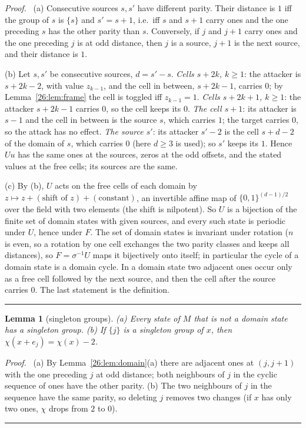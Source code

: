 \documentclass[10pt,a4paper]{article}
\newtheorem{lemma}[theorem]{Lemma}
\newcommand{\qedmark}{\rule{1.1ex}{1.1ex}}
\newenvironment{proof}[1][Proof]{\par\smallskip\noindent\textit{#1.}\ }{\hfill\qedmark\par\smallskip}
\begin{document}
\begin{proof}
(a) Consecutive sources $s,s'$ have different parity. Their distance is $1$ iff the group of $s$ is $\{s\}$ and
$s'=s+1$, i.e.\ iff $s$ and $s+1$ carry ones and the one preceding $s$ has the other parity than $s$. Conversely, if
$j$ and $j+1$ carry ones and the one preceding $j$ is at odd distance, then $j$ is a source, $j+1$ is the next source,
and their distance is $1$.

(b) Let $s,s'$ be consecutive sources, $d=s'-s$. \emph{Cells $s+2k$, $k\ge1$}: the attacker is $s+2k-2$, with value
$z_{k-1}$, and the cell in between, $s+2k-1$, carries $0$; by Lemma~\ref{26:lem:frame} the cell is toggled iff
$z_{k-1}=1$. \emph{Cells $s+2k+1$, $k\ge1$}: the attacker $s+2k-1$ carries $0$, so the cell keeps its $0$.
\emph{The cell $s+1$}: its attacker is $s-1$ and the cell in between is the source $s$, which carries $1$; the target
carries $0$, so the attack has no effect. \emph{The source $s'$}: its attacker $s'-2$ is the cell $s+d-2$ of the
domain of $s$, which carries $0$ (here $d\ge3$ is used); so $s'$ keeps its $1$. Hence $Uu$ has the same ones at the
sources, zeros at the odd offsets, and the stated values at the free cells; its sources are the same.

(c) By (b), $U$ acts on the free cells of each domain by $z\mapsto z+(\text{shift of }z)+(\text{constant})$, an
invertible affine map of $\{0,1\}^{(d-1)/2}$ over the field with two elements (the shift is nilpotent). So $U$ is a
bijection of the finite set of domain states with given sources, and every such state is periodic under $U$, hence
under $F$. The set of domain states is invariant under rotation ($n$ is even, so a rotation by one cell exchanges
the two parity classes and keeps all distances), so $F=\sigma^{-1}U$ maps it bijectively onto itself; in particular
the cycle of a domain state is a domain cycle. In a domain state two adjacent ones occur only as a free cell followed by the next source, and then the
cell after the source carries $0$. The last statement is the definition.
\end{proof}

\begin{lemma}[singleton groups]\label{26:lem:singleton}
\textup{(a)} Every state of $M$ that is not a domain state has a singleton group.
\textup{(b)} If $\{j\}$ is a singleton group of $x$, then $\chi(x+e_j)=\chi(x)-2$.
\end{lemma}
\begin{proof}
(a) By Lemma~\ref{26:lem:domain}(a) there are adjacent ones at $(j,j+1)$ with the one preceding $j$ at odd distance;
both neighbours of $j$ in the cyclic sequence of ones have the other parity. (b) The two neighbours of $j$ in the
sequence have the same parity, so deleting $j$ removes two changes (if $x$ has only two ones, $\chi$ drops from $2$
to $0$).
\end{proof}
\end{document}
